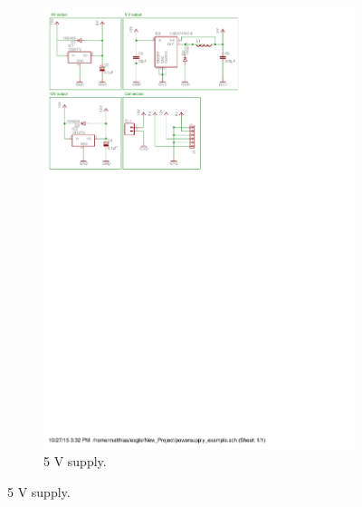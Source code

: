 \begin{figure}[H]
\begin{subfigure}{0.4\linewidth}
\includegraphics[scale=0.8,trim={5.3cm 24cm 7.8cm 0.6cm},clip]{img/powersupply.pdf}
\caption{5 V supply.}
\label{fig::sch_power_5V}
\end{subfigure}


\end{figure}
